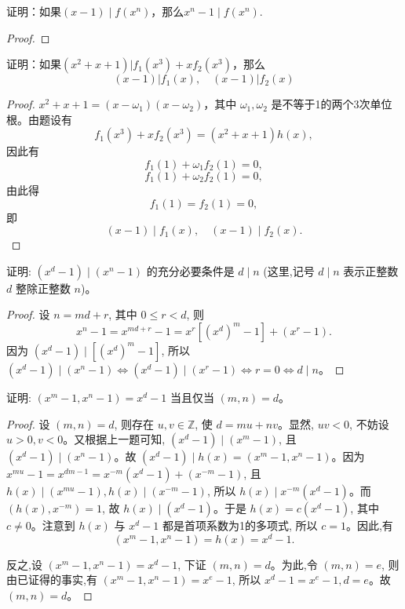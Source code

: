 \documentclass[lang=cn,12pt]{elegantbook}
\begin{document}
\begin{example}
    证明：如果$(x-1)\mid f(x^n)$，那么$x^n-1 \mid f(x^n)$.
\end{example}

\begin{proof}
    
\end{proof}

\begin{example}
    证明：如果$(x^2+x+1)|f_1(x^3)+xf_2(x^3)$，那么
    \[
    (x-1)|f_1(x),\quad(x-1)|f_2(x)
    \]
\end{example}

\begin{proof}
     \( x^2 + x + 1 = (x - \omega_1)(x - \omega_2) \)，其中 \(\omega_1, \omega_2\) 是不等于1的两个3次单位根。由题设有  
\[ f_1(x^3) + xf_2(x^3) = (x^2 + x + 1)h(x), \]  
因此有  
\[ f_1(1) + \omega_1 f_2(1) = 0, \]  
\[ f_1(1) + \omega_2 f_2(1) = 0, \]  
由此得  
\[ f_1(1) = f_2(1) = 0, \]  
即  
\[ (x - 1)\mid f_1(x),\quad (x - 1)\mid f_2(x). \]
\end{proof}

\begin{example}
证明: \( (x^d-1) \mid (x^n-1) \) 的充分必要条件是 \( d \mid n \) (这里,记号 \( d \mid n \) 表示正整数 \( d \) 整除正整数 \( n \))。
\end{example}

\begin{proof}
设 \( n = md + r \), 其中 \( 0 \leq r < d \), 则
\[ x^n - 1 = x^{md+r} - 1 = x^r [(x^d)^m - 1] + (x^r - 1). \]
因为 \( (x^d-1) \mid [(x^d)^m-1] \), 所以 \( (x^d-1) \mid (x^n-1) \iff (x^d-1) \mid (x^r-1) \iff r=0 \iff d \mid n \)。
\end{proof}

\begin{example}
证明: \( (x^m-1,x^n-1)=x^d-1 \) 当且仅当 \( (m,n)=d \)。
\end{example}

\begin{proof}
设 \( (m,n)=d \), 则存在 \( u,v \in \mathbb{Z} \), 使 \( d = mu + nv \)。显然, \( uv<0 \), 不妨设 \( u>0,v<0 \)。又根据上一题可知, \( (x^d-1) \mid (x^m-1) \), 且 \( (x^d-1) \mid (x^n-1) \)。故 \( (x^d-1) \mid h(x) = (x^m-1,x^n-1) \)。因为 \( x^{mu}-1=x^{dm-1}=x^{-m}(x^d-1)+(x^{-m}-1) \), 且 \( h(x) \mid (x^{mu}-1),h(x) \mid (x^{-m}-1) \), 所以 \( h(x) \mid x^{-m}(x^d-1) \)。而 \( (h(x),x^{-m})=1 \), 故 \( h(x) \mid (x^d-1) \)。于是 \( h(x) = c(x^d-1) \), 其中 \( c \neq 0 \)。注意到 \( h(x) \) 与 \( x^d-1 \) 都是首项系数为1的多项式, 所以 \( c=1 \)。因此,有
\[ (x^m-1,x^n-1)=h(x)=x^d-1. \]

反之,设 \( (x^m-1,x^n-1)=x^d-1 \), 下证 \( (m,n)=d \)。为此,令 \( (m,n)=e \), 则由已证得的事实,有 \( (x^m-1,x^n-1)=x^e-1 \), 所以 \( x^d-1=x^e-1,d=e \)。故 \( (m,n)=d \)。
\end{proof}
\end{document}
